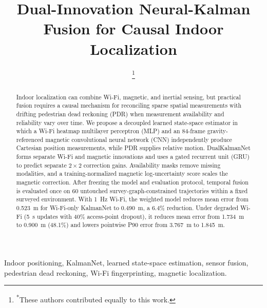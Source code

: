\documentclass[conference]{IEEEtran}
\begin{document}
\title{Dual-Innovation Neural-Kalman Fusion for Causal Indoor Localization}

\author{
\thanks{\textsuperscript{*}These authors contributed equally to this work.}
}

\maketitle

\begin{abstract}
Indoor localization can combine Wi-Fi, magnetic, and inertial sensing, but practical fusion requires a causal mechanism for reconciling sparse spatial measurements with drifting pedestrian dead reckoning (PDR) when measurement availability and reliability vary over time. We propose a decoupled learned state-space estimator in which a Wi-Fi heatmap multilayer perceptron (MLP) and an 84-frame gravity-referenced magnetic convolutional neural network (CNN) independently produce Cartesian position measurements, while PDR supplies relative motion. DualKalmanNet forms separate Wi-Fi and magnetic innovations and uses a gated recurrent unit (GRU) to predict separate $2\times2$ correction gains. Availability masks remove missing modalities, and a training-normalized magnetic log-uncertainty score scales the magnetic correction. After freezing the model and evaluation protocol, temporal fusion is evaluated once on 60 untouched survey-graph-constrained trajectories within a fixed surveyed environment. With 1~Hz Wi-Fi, the weighted model reduces mean error from 0.523~m for Wi-Fi-only KalmanNet to 0.490~m, a 6.4\% reduction. Under degraded Wi-Fi (5~s updates with 40\% access-point dropout), it reduces mean error from 1.734~m to 0.900~m (48.1\%) and lowers pointwise P90 error from 3.767~m to 1.845~m.
\end{abstract}

\begin{IEEEkeywords}
Indoor positioning, KalmanNet, learned state-space estimation, sensor fusion, pedestrian dead reckoning, Wi-Fi fingerprinting, magnetic localization.
\end{IEEEkeywords}
\end{document}
